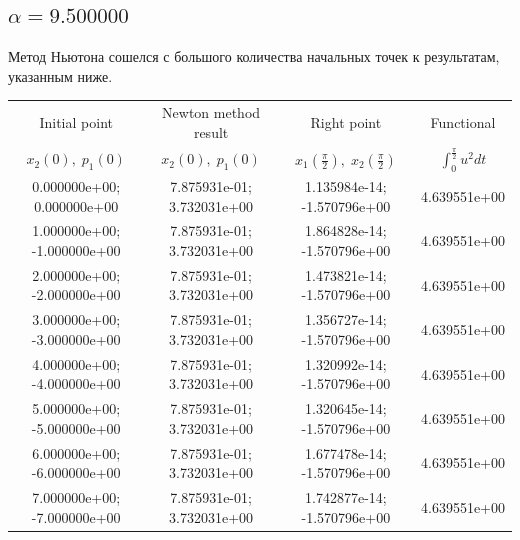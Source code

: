 \documentclass[titlepage]{article}
\def\l{\left}
\def\r{\right}
\begin{document}
\subsection{$\alpha = 9.500000$} 
Метод Ньютона сошелся с большого количества начальных точек к результатам, указанным ниже. \\ 
\begin{tabular}{ | c | c | c | c |} 
\hline 
Initial point  & Newton method result & Right point & Functional 
 \\ $x_2(0), \; p_1(0)$ & $x_2(0), \; p_1(0)$ & $x_1\l(\frac{\pi}{2}\r), \; x_2\l(\frac{\pi}{2}\r)$ & $\int_{0}^{\frac{\pi}{2}}u^2dt$  \\ \hline 
0.000000e+00; 0.000000e+00 & 7.875931e-01; 3.732031e+00 & 1.135984e-14; -1.570796e+00 & 4.639551e+00 \\ \hline 
1.000000e+00; -1.000000e+00 & 7.875931e-01; 3.732031e+00 & 1.864828e-14; -1.570796e+00 & 4.639551e+00 \\ \hline 
2.000000e+00; -2.000000e+00 & 7.875931e-01; 3.732031e+00 & 1.473821e-14; -1.570796e+00 & 4.639551e+00 \\ \hline 
3.000000e+00; -3.000000e+00 & 7.875931e-01; 3.732031e+00 & 1.356727e-14; -1.570796e+00 & 4.639551e+00 \\ \hline 
4.000000e+00; -4.000000e+00 & 7.875931e-01; 3.732031e+00 & 1.320992e-14; -1.570796e+00 & 4.639551e+00 \\ \hline 
5.000000e+00; -5.000000e+00 & 7.875931e-01; 3.732031e+00 & 1.320645e-14; -1.570796e+00 & 4.639551e+00 \\ \hline 
6.000000e+00; -6.000000e+00 & 7.875931e-01; 3.732031e+00 & 1.677478e-14; -1.570796e+00 & 4.639551e+00 \\ \hline 
7.000000e+00; -7.000000e+00 & 7.875931e-01; 3.732031e+00 & 1.742877e-14; -1.570796e+00 & 4.639551e+00 \\ \hline 
\end{tabular} 
\end{document}
